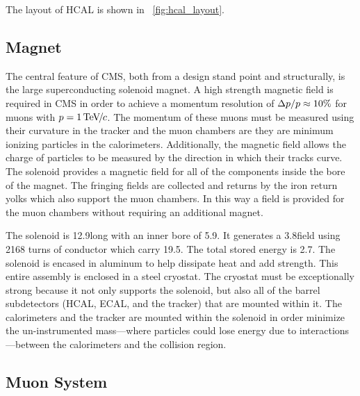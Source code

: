 The layout of HCAL is shown in \FIG~\ref{fig:hcal_layout}.

\subsection{Magnet}

The central feature of CMS, both from a design stand point and structurally, is
the large superconducting solenoid magnet. A high strength magnetic field is
required in CMS in order to achieve a momentum resolution of $\Delta p
/ p \approx 10\%$ for muons with $p = 1 {\,\text{Te\hspace{-.08em}V\hspace{-0.16em}/\hspace{-0.08em}}c}$. The momentum of
these muons must be measured using their curvature in the tracker and the muon
chambers are they are minimum ionizing particles in the calorimeters.
Additionally, the magnetic field allows the charge of particles to be measured
by the direction in which their tracks curve. The solenoid provides a magnetic
field for all of the components inside the bore of the magnet. The fringing
fields are collected and returns by the iron return yolks which also support
the muon chambers. In this way a field is provided for the muon chambers
without requiring an additional magnet.

The solenoid is 12.9\meters long with an inner bore of 5.9\meters. It generates
a 3.8\tesla field using 2168 turns of conductor which carry 19.5\kiloamps. The
total stored energy is 2.7\gigajoules. The solenoid is encased in aluminum to
help dissipate heat and add strength. This entire assembly is enclosed in a
steel cryostat. The cryostat must be exceptionally strong because it not only
supports the solenoid, but also all of the barrel subdetectors (HCAL, ECAL, and
the tracker) that are mounted within it. The calorimeters and the tracker are
mounted within the solenoid in order minimize the un-instrumented mass---where
particles could lose energy due to interactions---between the calorimeters and
the collision region.

\subsection{Muon System}

